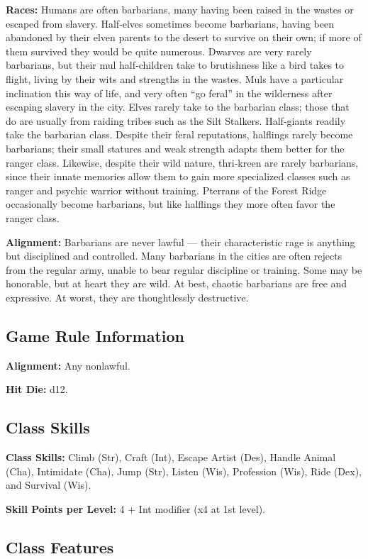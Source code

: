 \documentclass[10pt,a4paper,twocolumn]{d20}
\begin{document}
{\textbf{Races:} Humans are often barbarians, many having been raised in the wastes or escaped from slavery. Half‐elves sometimes become barbarians, having been abandoned by their elven parents to the desert to survive on their own; if more of them survived they would be quite numerous. Dwarves are very rarely barbarians, but their mul half‐children take to brutishness like a bird takes to flight, living by their wits and strengths in the wastes. Muls have a particular inclination this way of life, and very often ``go feral'' in the wilderness after escaping slavery in the city. Elves rarely take to the barbarian class; those that do are usually from raiding tribes such as the Silt Stalkers. Half‐giants readily take the barbarian class. Despite their feral reputations, halflings rarely become barbarians; their small statures and weak strength adapts them better for the ranger class. Likewise, despite their wild nature, thri‐kreen are rarely barbarians, since their innate memories allow them to gain more specialized classes such as ranger and psychic warrior without training. Pterrans of the Forest Ridge occasionally become barbarians, but like halflings they more often favor the ranger class.

\textbf{Alignment:} Barbarians are never lawful — their characteristic rage is anything but disciplined and controlled. Many barbarians in the cities are often rejects from the regular army, unable to bear regular discipline or training. Some may be honorable, but at heart they are wild. At best, chaotic barbarians are free and expressive. At worst, they are thoughtlessly destructive.

\subsection{Game Rule Information}
\textbf{Alignment:} Any nonlawful.

\textbf{Hit Die:} d12.

\subsection{Class Skills}
\textbf{Class Skills:} Climb (Str), Craft (Int), Escape Artist (Des), Handle Animal (Cha), Intimidate (Cha), Jump (Str), Listen (Wis),    Profession (Wis), Ride (Dex), and Survival (Wis).

\textbf{Skill Points per Level:} 4 + Int modifier (x4 at 1st level).

\subsection{Class Features}

}
\end{document}
